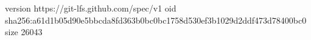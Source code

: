 version https://git-lfs.github.com/spec/v1
oid sha256:a61d1b05d90e5bbcda8fd363b0bc0bc1758d530ef3b1029d2ddf473d78400bc0
size 26043
